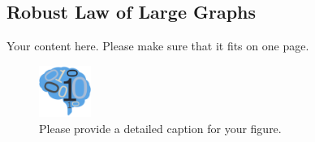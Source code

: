 \documentclass[simplex.tex]{subfiles}
\begin{document}
\subsection{Robust Law of Large Graphs}
Your content here. Please make sure that it fits on one page.

\begin{figure}[!h]
\begin{cframed}
\centering
\includegraphics[width=0.15\textwidth]{neurodata_small.png}
\caption{Please provide a detailed caption for your figure.}
\label{fig:meda}
\end{cframed}
\end{figure}
%
%
%
\end{document}
